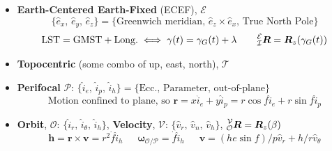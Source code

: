 \documentclass[twocolumn]{article}    %
\begin{document}
\begin{itemize}
    \item \textbf{Earth-Centered Earth-Fixed} (ECEF), \(\mathcal{E}\)
    \begin{equation*}
        \{\hat{e}_x,\, \hat{e}_y,\, \hat{e}_z\} = \{\text{Greenwich meridian},\,  \hat{e}_z \times \hat{e}_x ,\, \text{True North Pole}\}
    \end{equation*}
    \begin{equation*}
        \text{LST} = \text{GMST} + \text{Long.} \iff \gamma(t) = \gamma_G(t) + \lambda \hspace{19pt}        \prescript{\mathcal{E}}{\mathcal{I}}{\bm{R}} =\bm{R}_z(\gamma_G(t)) 
    \end{equation*}

    \item \textbf{Topocentric} (some combo of up, east, north), \(\mathcal{T}\)

    

    \item \textbf{Perifocal} \(\mathcal{P}:\,\{\hat{i}_e,\, \hat{i}_p,\, \hat{i}_h\} = \{\text{Ecc.},\, \text{Parameter},\, \text{out-of-plane}\}\)
    \begin{equation*}
        \text{Motion confined to plane, so } \bm{r} = x\hat{i}_e + y\hat{i}_p = r\cos f \hat{i}_e + r\sin f\hat{i}_p
    \end{equation*}

    \item \textbf{Orbit}, \(\mathcal{O}: \, \{\hat{i}_r,\, \hat{i}_\theta,\, \hat{i}_h \}\), \textbf{Velocity}, \(\mathcal{V}: \, \{\hat{v}_r,\, \hat{v}_n,\, \hat{v}_h \}\), \(\prescript{\mathcal{V}}{\mathcal{O}}{\bm{R}} =\bm{R}_z(\beta) \)
    \begin{equation*}
         \bm{h} = \bm{r} \times \bm{v} = r^2 \dot{f} \hat{i}_h \hspace{18pt} \bm{\omega}_{\mathcal{O}/\mathcal{P}} = \dot{f} \hat{i}_h \hspace{18pt} \bm{v} = (he\sin f)/p \hat{v}_r + h/r\hat{v}_\theta
    \end{equation*}




\end{itemize}
\end{document}
